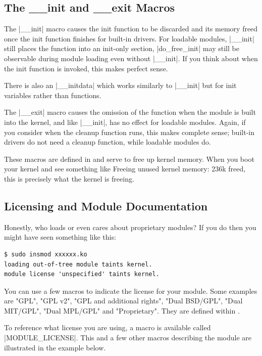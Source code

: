\documentclass[10pt, oneside]{book}
\begin{document}
\subsection{The \_\_init and \_\_exit Macros}
\label{sec:init_n_exit}
The \cpp|__init| macro causes the init function to be discarded and its memory freed once the init function finishes for built-in drivers.
For loadable modules, \cpp|__init| still places the function into an init-only section, \cpp|do_free_init| may still be observable during module loading even without \cpp|__init|.
If you think about when the init function is invoked, this makes perfect sense.

There is also an \cpp|__initdata| which works similarly to \cpp|__init| but for init variables rather than functions.

The \cpp|__exit| macro causes the omission of the function when the module is built into the kernel, and like \cpp|__init|, has no effect for loadable modules.
Again, if you consider when the cleanup function runs, this makes complete sense; built-in drivers do not need a cleanup function, while loadable modules do.

These macros are defined in  and serve to free up kernel memory.
When you boot your kernel and see something like Freeing unused kernel memory: 236k freed, this is precisely what the kernel is freeing.


\subsection{Licensing and Module Documentation}
\label{sec:modlicense}
Honestly, who loads or even cares about proprietary modules?
If you do then you might have seen something like this:
\begin{verbatim}
$ sudo insmod xxxxxx.ko
loading out-of-tree module taints kernel.
module license 'unspecified' taints kernel.
\end{verbatim}

You can use a few macros to indicate the license for your module.
Some examples are "GPL", "GPL v2", "GPL and additional rights", "Dual BSD/GPL", "Dual MIT/GPL", "Dual MPL/GPL" and "Proprietary".
They are defined within .

To reference what license you are using, a macro is available called \cpp|MODULE_LICENSE|.
This and a few other macros describing the module are illustrated in the example below.
\end{document}
